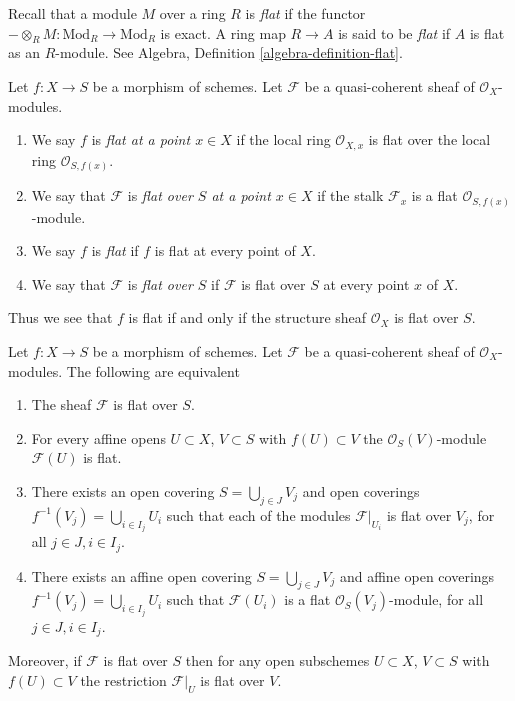 \medskip\noindent
Recall that a module $M$ over a ring $R$ is {\it flat} if the functor
$-\otimes_R M : \text{Mod}_R \to \text{Mod}_R$ is exact. A ring map
$R \to A$ is said to be {\it flat} if $A$ is flat as an $R$-module.
See
Algebra, Definition \ref{algebra-definition-flat}.

\begin{definition}
\label{definition-flat}
Let $f : X \to S$ be a morphism of schemes.
Let $\mathcal{F}$ be a quasi-coherent sheaf of $\mathcal{O}_X$-modules.
\begin{enumerate}
\item We say $f$ is {\it flat at a point $x \in X$} if the
local ring $\mathcal{O}_{X, x}$ is flat over the local ring
$\mathcal{O}_{S, f(x)}$.
\item We say that $\mathcal{F}$ is {\it flat over $S$ at a point $x \in X$}
if the stalk $\mathcal{F}_x$ is a flat $\mathcal{O}_{S, f(x)}$-module.
\item We say $f$ is {\it flat} if $f$ is flat at every point of $X$.
\item We say that $\mathcal{F}$ is {\it flat over $S$} if
$\mathcal{F}$ is flat over $S$ at every point $x$ of $X$.
\end{enumerate}
\end{definition}

\noindent
Thus we see that $f$ is flat if and only if
the structure sheaf $\mathcal{O}_X$ is flat over $S$.

\begin{lemma}
\label{lemma-flat-module-characterize}
Let $f : X \to S$ be a morphism of schemes.
Let $\mathcal{F}$ be a quasi-coherent sheaf of $\mathcal{O}_X$-modules.
The following are equivalent
\begin{enumerate}
\item The sheaf $\mathcal{F}$ is flat over $S$.
\item For every affine opens $U \subset X$, $V \subset S$
with $f(U) \subset V$ the $\mathcal{O}_S(V)$-module $\mathcal{F}(U)$ is flat.
\item There exists an open covering $S = \bigcup_{j \in J} V_j$
and open coverings $f^{-1}(V_j) = \bigcup_{i \in I_j} U_i$ such
that each of the modules $\mathcal{F}|_{U_i}$ is
flat over $V_j$, for all $j\in J, i\in I_j$.
\item There exists an affine open covering $S = \bigcup_{j \in J} V_j$
and affine open coverings $f^{-1}(V_j) = \bigcup_{i \in I_j} U_i$ such
that $\mathcal{F}(U_i)$ is a flat $\mathcal{O}_S(V_j)$-module, for all
$j\in J, i\in I_j$.
\end{enumerate}
Moreover, if $\mathcal{F}$ is flat over $S$ then for
any open subschemes $U \subset X$, $V \subset S$ with $f(U) \subset V$
the restriction $\mathcal{F}|_U$ is flat over $V$.
\end{lemma}

